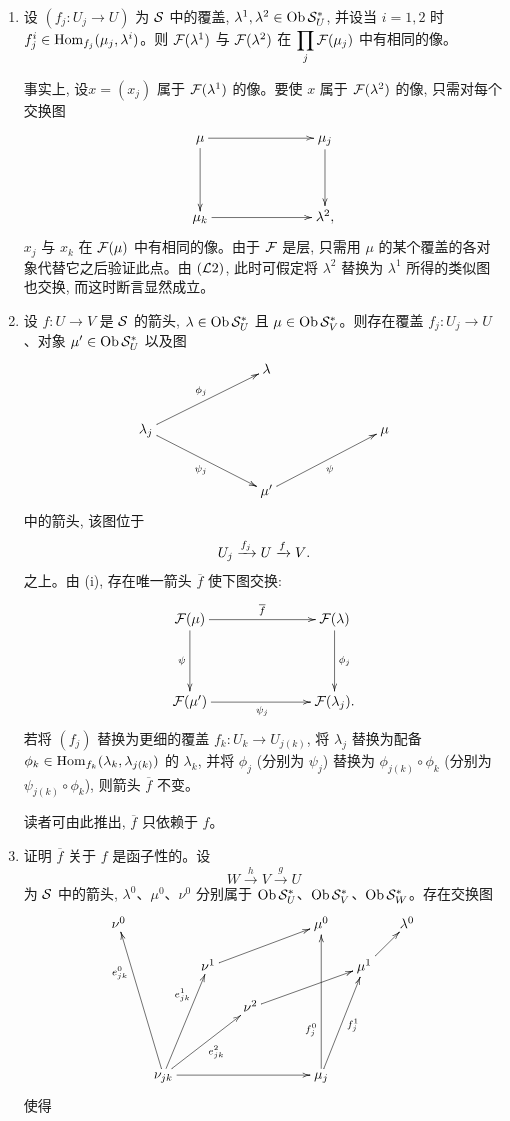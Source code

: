 \begin{enumerate}
\renewcommand{\theenumi}{\roman{enumi}}
\renewcommand{\labelenumi}{(\theenumi)}
\item 设 $(f_j:U_j\to U)$ 为 ${\mathcal S}$ 中的覆盖, $\lambda^1,\lambda^2\in\operatorname{Ob}{\mathcal S}^{\ast}_U$, 并设当 $i=1,2$ 时 $f_j^i\in\operatorname{Hom}_{f_j}(\mu_j,\lambda^i)$。则 ${\mathcal F}(\lambda^1)$ 与 ${\mathcal F}(\lambda^2)$ 在 $\displaystyle\mathop{\prod}_j{\mathcal F}(\mu_j)$ 中有相同的像。

事实上, 设\pageoriginale $x=(x_j)$ 属于 ${\mathcal F}(\lambda^1)$ 的像。要使 $x$ 属于 ${\mathcal F}(\lambda^2)$ 的像, 只需对每个交换图
\[
\xymatrix@C=2.5cm@R=1.5cm{
\mu\ar[r]\ar[d]&\mu_j\ar[d]\\
\mu_k\ar[r]&\lambda^2,
}
\]
$x_j$ 与 $x_k$ 在 ${\mathcal F}(\mu)$ 中有相同的像。由于 ${\mathcal F}$ 是层, 只需用 $\mu$ 的某个覆盖的各对象代替它之后验证此点。由 $({\mathcal L}2)$, 此时可假定将 $\lambda^2$ 替换为 $\lambda^1$ 所得的类似图也交换, 而这时断言显然成立。

\item 设 $f:U\to V$ 是 ${\mathcal S}$ 的箭头, $\lambda\in\operatorname{Ob}{\mathcal S}^{\ast}_U$ 且 $\mu\in\operatorname{Ob}{\mathcal S}^{\ast}_V$。则存在覆盖 $f_j:U_j\to U$、对象 $\mu'\in\operatorname{Ob}{\mathcal S}^{\ast}_U$ 以及图
\[
\xymatrix@C=2.5cm@R=1cm{
&\lambda&\\
\lambda_j\ar[ru]^{\phi_j}\ar[rd]_{\psi_j}&&\mu\\
&\mu'\ar[ru]_{\psi}&
}
\]
中的箭头, 该图位于
$$
U_j\xrightarrow{f_j}U\xrightarrow{f}V{}.
$$
之上。由 (i), 存在唯一箭头 $\overline f$ 使下图交换:
\[
\xymatrix@C=2.5cm@R=1.5cm{
\Ff(\mu)\ar[r]^{\overline f}\ar[d]_{\psi}&
\Ff(\lambda)\ar[d]^{\phi_j}\\
\Ff(\mu')\ar[r]_{\psi_j}&\Ff(\lambda_j).
}
\]
若将 $(f_j)$ 替换为更细的覆盖 $f_k:U_k\to U_{j(k)}$, 将 $\lambda_j$ 替换为配备 $\phi_k\in\operatorname{Hom}_{f_k}(\lambda_k,\lambda_{j(k)})$ 的 $\lambda_k$, 并将 $\phi_j$ (分别为 $\psi_j$) 替换为 $\phi_{j(k)}\circ\phi_k$ (分别为 $\psi_{j(k)}\circ\phi_k$), 则箭头 $\overline f$ 不变。\pageoriginale

读者可由此推出, $\overline f$ 只依赖于 $f$。

\item 证明 $\overline f$ 关于 $f$ 是函子性的。设
$$
W\xrightarrow{h}V\xrightarrow{g}U
$$
为 ${\mathcal S}$ 中的箭头, $\lambda^0$、$\mu^0$、$\nu^0$ 分别属于 $\operatorname{Ob}{\mathcal S}^{\ast}_U$、$\operatorname{Ob}{\mathcal S}^{\ast}_V$、$\operatorname{Ob}{\mathcal S}^{\ast}_W$。存在交换图
\[
\xymatrix@C=.5cm@R=.5cm{
\nu^{0}& &&&&\mu^{0}&&\lambda^{0}\\
&&\nu^{1}\ar[rrru]&&&&\mu^{1}\ar[ru]&\\
&&&{\nu^{2}}\ar[rrru]&&&&\\
&&&&&&&\\
&\nu_{jk}\ar[luuuu]^(.7){e^{0}_{jk}}
\ar[uuur]^(.7){e^{1}_{jk}}\ar[rruu]_{e^{2}_{jk}}\ar[rrrr]&&&&
\mu_j\ar[uuur]_{f^{1}_j}\ar[uuuu]^(.3){f^{0}_j}&&
}
\]
使得


\end{enumerate}
